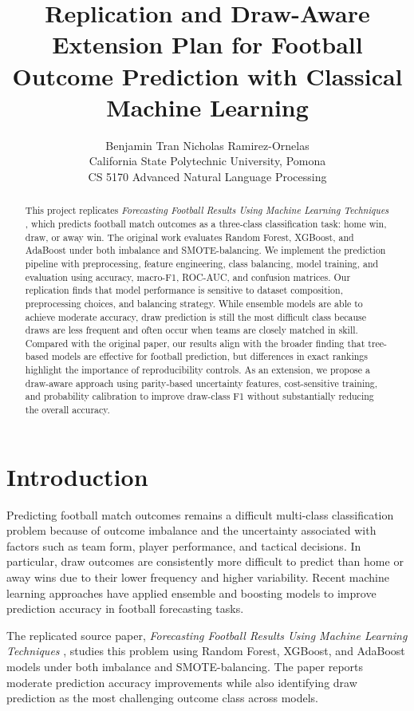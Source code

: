 \documentclass[11pt]{article}
\title{Replication and Draw-Aware Extension Plan for Football Outcome Prediction with Classical Machine Learning}
\author{
Benjamin Tran 
\AND 
Nicholas Ramirez-Ornelas \\[0.5em]
California State Polytechnic University, Pomona \\
CS 5170 Advanced Natural Language Processing
}
\begin{document}
\maketitle

\begin{abstract}
This project replicates \textit{Forecasting Football Results Using Machine Learning Techniques} \cite{armanda2025forecasting}, which predicts football match outcomes as a three-class classification task: home win, draw, or away win. The original work evaluates Random Forest, XGBoost, and AdaBoost under both imbalance and SMOTE-balancing. We implement the prediction pipeline with preprocessing, feature engineering, class balancing, model training, and evaluation using accuracy, macro-F1, ROC-AUC, and confusion matrices. Our replication finds that model performance is sensitive to dataset composition, preprocessing choices, and balancing strategy. While ensemble models are able to achieve moderate accuracy, draw prediction is still the most difficult class because draws are less frequent and often occur when teams are closely matched in skill. Compared with the original paper, our results align with the broader finding that tree-based models are effective for football prediction, but differences in exact rankings highlight the importance of reproducibility controls. As an extension, we propose a draw-aware approach using parity-based uncertainty features, cost-sensitive training, and probability calibration to improve draw-class F1 without substantially reducing the overall accuracy.
\end{abstract}

\section{Introduction}

Predicting football match outcomes remains a difficult multi-class classification problem because of outcome imbalance and the uncertainty associated with factors such as team form, player performance, and tactical decisions. In particular, draw outcomes are consistently more difficult to predict than home or away wins due to their lower frequency and higher variability. Recent machine learning approaches have applied ensemble and boosting models to improve prediction accuracy in football forecasting tasks.

The replicated source paper, \textit{Forecasting Football Results Using Machine Learning Techniques} \cite{armanda2025forecasting}, studies this problem using Random Forest, XGBoost, and AdaBoost models under both imbalance and SMOTE-balancing. The paper reports moderate prediction accuracy improvements while also identifying draw prediction as the most challenging outcome class across models. 
\end{document}
